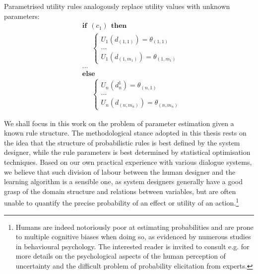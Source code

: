 Parametrised utility rules analogously replace utility values with unknown parameters:
\begin{equation}
\begin{aligned}
& \textbf{if} \ \ (c_{1}) \ \ \textbf{then} \\ 
& \;\;\;\;\; \begin{cases}
U_1(d_{(1,1)}) = \theta_{(1,1)} \\
 ... \\
U_1(d_{(1,m_1)}) = \theta_{(1,m_1)}
\end{cases} \\[3mm]
& ...  \\
& \textbf{else} \\
& \;\;\;\;\; \begin{cases}
U_n(d_n^1) = \theta_{(n,1)} \\
... \\
U_n(d_{(n,m_n)}) = \theta_{(n,m_n)}
\end{cases}
\end{aligned}
\end{equation} 

We shall focus in this work on the problem of parameter estimation given a known rule structure.  The methodological stance adopted in this thesis rests on the idea that the structure of probabilistic rules is best defined by the system designer, while the rule parameters is best determined by statistical optimisation techniques. Based on our own practical experience with various dialogue systems, we believe that such division of labour between the human designer and the learning algorithm is a sensible one, as system designers generally have a good grasp of the domain structure and relations between variables, but are often unable to quantify the precise probability of an effect or utility of an action.\footnote{Humans are indeed notoriously poor at estimating probabilities and are prone to multiple cognitive biases when doing so, as evidenced by numerous studies in behavioural psychology.  The interested reader is invited to consult e.g. \cite{KahnemanSlovicTversky81,morganhenrion} for more details on the psychological aspects of the human perception of uncertainty and the difficult problem of probability elicitation from experts.}

